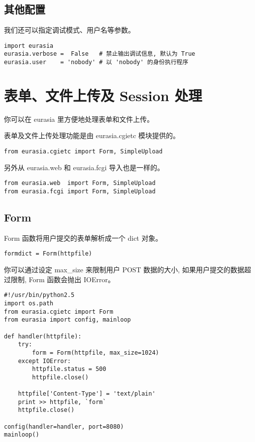 \documentclass{manual}
\begin{document}

\subsection{其他配置}

我们还可以指定调试模式、用户名等参数。

\begin{verbatim}
import eurasia
eurasia.verbose =  False   # 禁止输出调试信息, 默认为 True
eurasia.user    = 'nobody' # 以 'nobody' 的身份执行程序
\end{verbatim}

\section{表单、文件上传及 Session 处理}

你可以在 eurasia 里方便地处理表单和文件上传。

表单及文件上传处理功能是由 eurasia.cgietc 模块提供的。

\begin{verbatim}
from eurasia.cgietc import Form, SimpleUpload
\end{verbatim}

另外从 eurasia.web 和 eurasia.fcgi 导入也是一样的。

\begin{verbatim}
from eurasia.web  import Form, SimpleUpload
from eurasia.fcgi import Form, SimpleUpload
\end{verbatim}


\subsection{Form}

Form 函数将用户提交的表单解析成一个 dict 对象。

\begin{verbatim}
formdict = Form(httpfile)
\end{verbatim}

你可以通过设定 max_size 来限制用户 POST 数据的大小, 如果用户提交的数据超过限制, Form 函数会抛出 IOError。

\begin{verbatim}
#!/usr/bin/python2.5
import os.path
from eurasia.cgietc import Form
from eurasia import config, mainloop

def handler(httpfile):
	try:
		form = Form(httpfile, max_size=1024)
	except IOError:
		httpfile.status = 500
		httpfile.close()

	httpfile['Content-Type'] = 'text/plain'
	print >> httpfile, `form`
	httpfile.close()

config(handler=handler, port=8080)
mainloop()
\end{verbatim}
\end{document}
